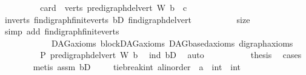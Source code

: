 \begin{isabellebody}
\ \ \ \ \ \ \isamarkupfalse%
\ \isamarkupfalse%
\ {\isachardoublequoteopen}card\ {\isacharparenleft}{\kern0pt}\ verts\ {\isacharparenleft}{\kern0pt}pre{\isacharunderscore}{\kern0pt}digraph{\isachardot}{\kern0pt}del{\isacharunderscore}{\kern0pt}vert\ W\ b{\isacharparenright}{\kern0pt}{\isacharparenright}{\kern0pt}\ {\isacharequal}{\kern0pt}\ c{\isachardoublequoteclose}\ \isanewline
\ \ \ \ \ \ \ \ \isamarkupfalse%
\ in{\isacharunderscore}{\kern0pt}verts\ fin{\isacharunderscore}{\kern0pt}digraph{\isachardot}{\kern0pt}finite{\isacharunderscore}{\kern0pt}verts\ bD\ fin{\isacharunderscore}{\kern0pt}digraph{\isacharunderscore}{\kern0pt}del{\isacharunderscore}{\kern0pt}vert\ \isanewline
\ \ \ \ \ \ \ \ \ size\isanewline
\ \ \ \ \ \ \ \ \isamarkupfalse%
\ {\isacharparenleft}{\kern0pt}simp\ add{\isacharcolon}{\kern0pt}\ fin{\isacharunderscore}{\kern0pt}digraph{\isachardot}{\kern0pt}finite{\isacharunderscore}{\kern0pt}verts\isanewline
\ \ \ \ \ \ \ \ \ \ \ \ DAG{\isachardot}{\kern0pt}axioms\ blockDAG{\isachardot}{\kern0pt}axioms\ DAGbased{\isachardot}{\kern0pt}axioms\ digraph{\isachardot}{\kern0pt}axioms{\isacharparenright}{\kern0pt}\ \isanewline
\ \ \ \ \ \ \isamarkupfalse%
\ \isamarkupfalse%
\ {\isachardoublequoteopen}P\ {\isacharparenleft}{\kern0pt}pre{\isacharunderscore}{\kern0pt}digraph{\isachardot}{\kern0pt}del{\isacharunderscore}{\kern0pt}vert\ W\ b{\isacharparenright}{\kern0pt}{\isachardoublequoteclose}\ \isamarkupfalse%
\ ind\ bD{}\ \isamarkupfalse%
\ auto\isanewline
\ \ \ \ \isamarkupfalse%
\isanewline
\ \ \ \ \isamarkupfalse%
\ {\isachardoublequoteopen}{\isacharquery}{\kern0pt}thesis{\isachardoublequoteclose}\ \isamarkupfalse%
\ cases{\isacharparenleft}{\kern0pt}{}{\isacharparenright}{\kern0pt}\isanewline
\ \ \ \ \ \ \isamarkupfalse%
\ {\isacharparenleft}{\kern0pt}metis\ assm{}\ bD{\isacharparenright}{\kern0pt}\ \isanewline
\ \ \isamarkupfalse%
\isanewline
{}\isamarkupfalse%
%
\endisatagproof
{\isafoldproof}%
%
\isadelimproof
%
\endisadelimproof
%
\isadelimdocument
%
\endisadelimdocument
%
\isatagdocument
%
\isamarkuptrue%
%
\isamarkuptrue%
%
\endisatagdocument
{\isafolddocument}%
%
\isadelimdocument
%
\endisadelimdocument
{}\isamarkupfalse%
\ tie{\isacharunderscore}{\kern0pt}break{\isacharunderscore}{\kern0pt}int{\isacharcolon}{\kern0pt}{\isacharcolon}{\kern0pt}\ {\isachardoublequoteopen}{\isacharprime}{\kern0pt}a{\isacharcolon}{\kern0pt}{\isacharcolon}{\kern0pt}linorder\ {\isasymRightarrow}\ {\isacharprime}{\kern0pt}a\ {\isasymRightarrow}\ int\ {\isasymRightarrow}\ int{\isachardoublequoteclose}\isanewline

\end{isabellebody}

